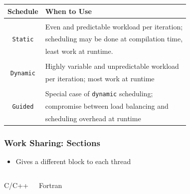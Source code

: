 \documentclass[10pt,t]{beamer}
\begin{document}
\begin{frame}[allowframebreaks]
  \begin{block}{}
    \begin{center}
      \begin{tabular}{cl}
        Schedule & When to Use \\
        \hline\\
        \multirow{3}{*}{\texttt{Static}} & Even and predictable workload per iteration; \\
        & scheduling may be done at compilation time,\\ 
        & least work at runtime.\\
        \\
        \multirow{2}{*}{\texttt{Dynamic}} & Highly variable and unpredictable workload \\
        & per iteration; most work at runtime \\
        \\
        \multirow{3}{*}{\texttt{Guided}} & Special case of \texttt{dynamic} scheduling; \\
        & compromise between load balancing and \\
        & scheduling overhead at runtime \\
      \end{tabular}
    \end{center}
  \end{block}
\end{frame}

\begin{frame}[fragile]
  \frametitle{Work Sharing: Sections}
  \begin{itemize}
    \item Gives a different block to each thread
  \end{itemize}
  \begin{columns}
    \begin{exampleblock}{C/C++}
      
    \end{exampleblock}
    \begin{exampleblock}{Fortran}
      
    \end{exampleblock}
  \end{columns}
\end{frame}
\end{document}
